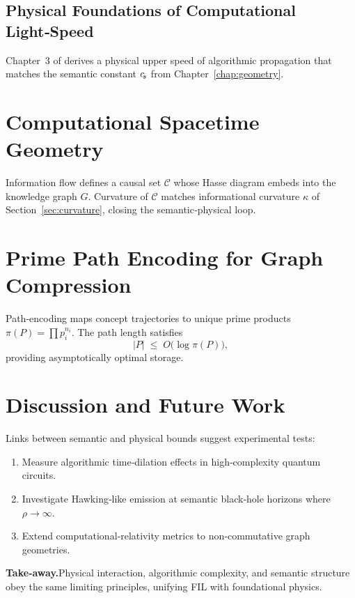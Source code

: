 \subsection{Physical Foundations of Computational Light‑Speed}
Chapter~3 of \cite{PhysLightSpeed} derives a physical upper speed of algorithmic propagation that matches the semantic constant $c_{\!s}$ from Chapter~\ref{chap:geometry}.

\section{Computational Spacetime Geometry}\label{sec:csg}
Information flow defines a causal set $\mathcal C$ whose Hasse diagram embeds into the knowledge graph $G$.  Curvature of $\mathcal C$ matches informational curvature $\kappa$ of Section~\ref{sec:curvature}, closing the semantic‑physical loop.

\section{Prime Path Encoding for Graph Compression}\label{sec:path-encoding}

Path‑encoding maps concept trajectories to unique prime products $\pi(P)=\prod p_i^{n_i}$.  The path length satisfies
\begin{equation}
  |P|\;\le\;O\bigl(\log \pi(P)\bigr),
\end{equation}
providing asymptotically optimal storage\cite{PathEncoding}.

\section{Discussion and Future Work}\label{sec:future}
Links between semantic and physical bounds suggest experimental tests:
\begin{enumerate}
  \item Measure algorithmic time‑dilation effects in high‑complexity quantum circuits.
  \item Investigate Hawking‑like emission at semantic black‑hole horizons where $\rho\to\infty$.
  \item Extend computational‑relativity metrics to non‑commutative graph geometries.
\end{enumerate}

\bigskip\noindent\textbf{Take‑away.}\;Physical interaction, algorithmic complexity, and semantic structure obey the same limiting principles, unifying FIL with foundational physics.

\clearpage
